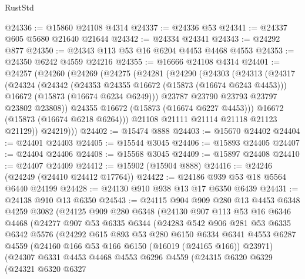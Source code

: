 \begin{lexlean}{RustStd}
\begin{coremodule}
@24336 := @15860 @24108 @4314
@24337 := @24336 @53
@24341 := @24337 @605 @5680 @21640 @21644
@24342 := @24334 @24341
@24343 := @24292 @877
@24350 := @24343 @113 @53 @16 @6204 @4453 @4468 @4553
@24353 := @24350 @6242 @4559 @24216
@24355 := @16666 @24108 @4314
@24401 := @24257
    (@24260
      (@24269
        (@24275
          (@24281
            (@24290
              (@24303
                (@24313
                  (@24317
                    (@24324
                      (@24342
                        (@24353 @24355 @16672 (@15873 (@16674 @6243 @4453)))
                        @16672
                        (@15873 (@16674 @6234 @6249)))
                      @23787
                      @23790
                      @23793
                      @23797
                      @23802
                      @23808))
                  @24355
                  @16672
                  (@15873 (@16674 @6227 @4453)))
                @16672
                (@15873 (@16674 @6218 @6264)))
              @21108
              @21111
              @21114
              @21118
              @21123
              @21129))
          @24219)))
@24402 := @15474 @888
@24403 := @15670 @24402
@24404 := @24401 @24403
@24405 := @15544 @3045
@24406 := @15893 @24405
@24407 := @24404 @24406
@24408 := @15568 @3045
@24409 := @15897 @24408
@24410 := @24407 @24409
@24412 := @15902 (@15904 @888)
@24416 := @24246 (@24249 (@24410 @24412 @17764))
@24422 := @24186 @939 @53 @18 @5564 @6440 @24199
@24428 := @24130 @910 @938 @13 @17 @6350 @6439
@24431 := @24138 @910 @13 @6350
@24543 := @24115
    @904
    @909
    @280
    @13
    @4453
    @6348
    @4259
    @3082
    (@24125
      @909
      @280
      @6348
      (@24130
        @907
        @113
        @53
        @16
        @6346
        @4468
        (@24277
          @907
          @53
          @6335
          @6344
          (@24283
            @542
            @906
            @281
            @53
            @6335
            @6342
            @5576
            (@24292
              @615
              @893
              @53
              @280
              @6150
              @6334
              @6341
              @4553
              @6287
              @4559
              (@24160 @166 @53 @166 @6150 (@16019 (@24165 @166)) @23971)
              (@24307
                @6331
                @4453
                @4468
                @4553
                @6296
                @4559
                (@24315
                  @6320
                  @6329
                  (@24321
                    @6320
                    @6327

\end{coremodule}
\end{lexlean}
